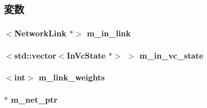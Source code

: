 \subsection{変数}
\hypertarget{classRouter_a4ff3f0c2e50626b517ea98c165c9a0c3}{
\subsubsection[{m\_\-in\_\-link}]{$<${\bf NetworkLink} $\ast$$>$ {\bf m\_\-in\_\-link}}}
\label{classRouter_a4ff3f0c2e50626b517ea98c165c9a0c3}
\hypertarget{classRouter_a9d8dfe7ed8a1027af42c383e180b8023}{
\subsubsection[{m\_\-in\_\-vc\_\-state}]{$<${\bf std::vector}$<${\bf InVcState} $\ast$$>$ $>$ {\bf m\_\-in\_\-vc\_\-state}}}
\label{classRouter_a9d8dfe7ed8a1027af42c383e180b8023}
\hypertarget{classRouter_a0894e57ab5d2ddc0e8c5d60a53a27cff}{
\subsubsection[{m\_\-link\_\-weights}]{$<$int$>$ {\bf m\_\-link\_\-weights}}}
\label{classRouter_a0894e57ab5d2ddc0e8c5d60a53a27cff}
\hypertarget{classRouter_a6f69c0ff922be798fa1cfce69f83244e}{
\subsubsection[{m\_\-net\_\-ptr}]{$\ast$ {\bf m\_\-net\_\-ptr}}}
